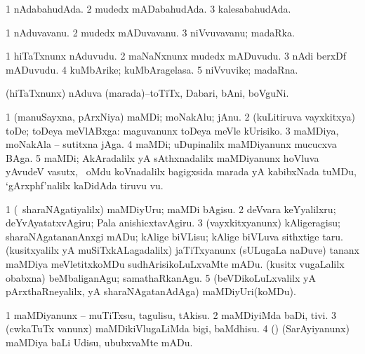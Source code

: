 \bentry
{}
\gl{\gu}
\bmng
\bnum
\num{1} nAdabahudAda. 
\num{2} mudedx mADabahudAda. 
\num{3} kalesabahudAda. 
\enum
\emng
\eentry

\bentry
{}
\gl{\nA}
\bmng
\bnum
\num{1} nAduvavanu. 
\num{2} mudedx mADuvavanu. 
\num{3} niVvuvavanu; madaRka. 
\enum
\emng
\eentry

\bentry
{}
\gl{\nA}
\bmng
\bnum
\num{1} hiTaTxnunx nAduvudu. 
\num{2} maNaNxnunx mudedx mADuvudu. 
\num{3} nAdi berxDf mADuvudu. 
\num{4} kuMbArike; kuMbAragelasa. 
\num{5} niVvuvike; madaRna. 
\enum
\emng
\eentry

\bentry
{}
\gl{\nA}
\bmng
(hiTaTxnunx) nAduva (marada)--toTiTx, Dabari, bAni, boVguNi. 
\emng
\eentry

\bentry
{}
\gl{\nA}
\bmng
\bnum
\num{1} (manuSayxna, pArxNiya) maMDi; moNakAlu; jAnu. 
\num{2} (kuLitiruva vayxkitxya) toDe; toDeya meVlABxga:  maguvanunx toDeya meVle kUrisiko. 
\num{3} maMDiya, moNakAla -- sutitxna jAga. 
\num{4} maMDi; uDupinalilx maMDiyanunx mucucxva BAga. 
\num{5} maMDi; AkAradalilx yA sAthxnadalilx maMDiyanunx hoVluva yAvudeV vasutx, \kanmu\ oMdu koVnadalilx bagigxsida marada yA kabibxNada tuMDu, `gArxphf'nalilx kaDidAda tiruvu \mo vu. 
\enum
\emng

\noindent
\gl{\nuga}
\bmng
\bnum
\num{1}   (\kanmu\ sharaNAgatiyalilx) maMDiyUru; maMDi bAgisu. 
\num{2}  deVvara keYyalilxru; deYvAyatatxvAgiru; Pala anishicxtavAgiru. 
\num{3}  (vayxkitxyanunx) kAligeragisu; sharaNAgatananAnxgi mADu; kAlige biVLisu; kAlige biVLuva sithxtige taru. 
  
\banum
{} (kusitxyalilx yA muSiTxkALagadalilx) jaTiTxyanunx (sULugaLa naDuve) tananx maMDiya meVletitxkoMDu sudhArisikoLuLxvaMte mADu. 
 (kusitx \mo vugaLalilx obabxna) beMbaliganAgu; samathaRkanAgu. 
\eanum
\numie
\num{5}  (beVDikoLuLxvalilx yA pArxthaRneyalilx, yA sharaNAgatanAdAga) maMDiyUri(koMDu). 
\enum
\emng
\eentry

\bentry
{}
\gl{\sakirx}
\bmng
\bnum
\num{1} maMDiyanunx -- muTiTxsu, tagulisu, tAkisu. 
\num{2} maMDiyiMda baDi, tivi. 
\num{3} (cwkaTuTx \mo vanunx) maMDikiVlugaLiMda bigi, baMdhisu. 
\num{4} (\AmA) (SarAyiyanunx) maMDiya baLi Udisu, ububxvaMte mADu. 
\enum
\emng
\eentry

